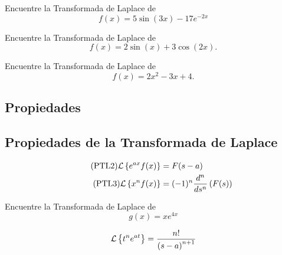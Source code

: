  \begin{resuelto}
  \label{bron:exmp:21.11}
  Encuentre la Transformada de Laplace de
  $$f(x)=5\sin(3x)-17e^{-2x}$$
 \end{resuelto}




 \begin{resuelto}
  \label{bron:exmp:21.12}
  Encuentre la Transformada de Laplace de
  $$f(x)=2\sin(x)+3\cos(2x).$$
 \end{resuelto}




 \begin{resuelto}
  \label{bron:exmp:21.13}
  Encuentre la Transformada de Laplace de
  $$f(x)=2x^{2}-3x+4.$$
 \end{resuelto}



\subsection{Propiedades}

\subsection{Propiedades de la Transformada de Laplace}
\begin{align*}
  \label{bron:21.4}
  \tag{PTL2}
  \mathcal{L}\left\{ e^{ax}f(x) \right\}&=F(s-a)\\
  \label{bron:21.5}
  \tag{PTL3}
  \mathcal{L}\left\{ x^{n}f(x) \right\}&=(-1)^{n}\dfrac{d^{n}}{ds^{n}}\left( F(s) \right)
\end{align*}


%
%
%
%
%
%
%
%

%
%
%


 \begin{resuelto}
  \label{bron:exmp:21.14}
  Encuentre la Transformada de Laplace de
  $$g(x)=xe^{4x}$$
 \end{resuelto}


{}
\begin{align*}
\label{tlt:22}
\mathcal{L}\left\{ t^{n}e^{at} \right\} = \dfrac{n!}{\left( s-a \right)^{n+1}}
\end{align*}


